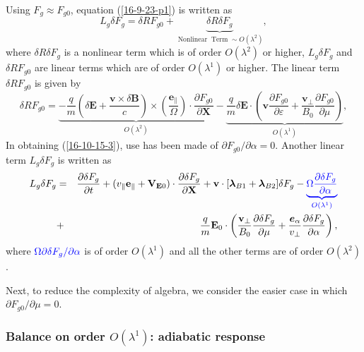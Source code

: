 \documentclass{article}
\newcommand{\tmcolor}[2]{{\color{#1}{#2}}}
\newcommand{\tmmathbf}[1]{\ensuremath{\boldsymbol{#1}}}
\newcommand{\tmop}[1]{\ensuremath{\operatorname{#1}}}
\begin{document}
Using $F_g \approx F_{g 0}$, equation (\ref{16-9-23-p1}) is written as
\begin{equation}
  \label{16-10-15-5} L_g \delta F_g = \delta R F_{g 0} + \underbrace{\delta R
  \delta F_g}_{\tmop{Nonlinear} \tmop{Term} \sim O (\lambda^2)},
\end{equation}
where $\delta R \delta F_g$ is a nonlinear term which is of order $O
(\lambda^2)$ or higher, $L_g \delta F_g$ and $\delta R F_{g 0}$ are linear
terms which are of order $O (\lambda^1)$ or higher. The linear term $\delta R
F_{g 0}$ is given by
\begin{equation}
  \label{16-10-15-3} \delta R F_{g 0} = \underbrace{- \frac{q}{m} \left(
  \delta \mathbf{E}+ \frac{\mathbf{v} \times \delta \mathbf{B}}{c} \right)
  \times \left( \frac{\tmmathbf{e}_{\parallel}}{\Omega}  \right) \cdot
  \frac{\partial F_{g 0}}{\partial \mathbf{X}}}_{O (\lambda^2)} -
  \underbrace{\frac{q}{m} \delta \mathbf{E} \cdot \left( \mathbf{v}
  \frac{\partial F_{g 0}}{\partial \varepsilon} +
  \frac{\mathbf{v}_{\perp}}{B_0}  \frac{\partial F_{g 0}}{\partial \mu}
  \right)}_{O (\lambda^1)},
\end{equation}
In obtaining (\ref{16-10-15-3}), use has been made of $\partial F_{g 0} /
\partial \alpha = 0$. Another linear term $L_g \delta F_g$ is written as
\begin{eqnarray}
  L_g \delta F_g & = & \frac{\partial \delta F_g}{\partial t} + (v_{\parallel}
  \mathbf{e}_{\parallel} +\mathbf{V}_{\mathbf{E}0}) \cdot \frac{\partial
  \delta F_g}{\partial \mathbf{X}} +\mathbf{v} \cdot [\tmmathbf{\lambda}_{B 1}
  +\tmmathbf{\lambda}_{B 2}] \delta F_g - \tmcolor{blue}{\underbrace{\Omega
  \frac{\partial \delta F_g}{\partial \alpha}}_{O (\lambda^1)}} \nonumber\\
  & + & \frac{q}{m} \mathbf{E}_0 \cdot \left( \frac{\mathbf{v}_{\perp}}{B_0} 
  \frac{\partial \delta F_g}{\partial \mu} +
  \frac{\tmmathbf{e}_{\alpha}}{v_{\perp}}  \frac{\partial \delta F_g}{\partial
  \alpha} \right),  \label{16-11-20-2}
\end{eqnarray}
where $\tmcolor{blue}{\Omega \partial \delta F_g / \partial \alpha}$ is of
order $O (\lambda^1)$ and all the other terms are of order $O (\lambda^2)$.

Next, to reduce the complexity of algebra, we consider the easier case in
which $\partial F_{g 0} / \partial \mu = 0$.

\subsubsection{Balance on order $O (\lambda^1)$: adiabatic response}
\end{document}
